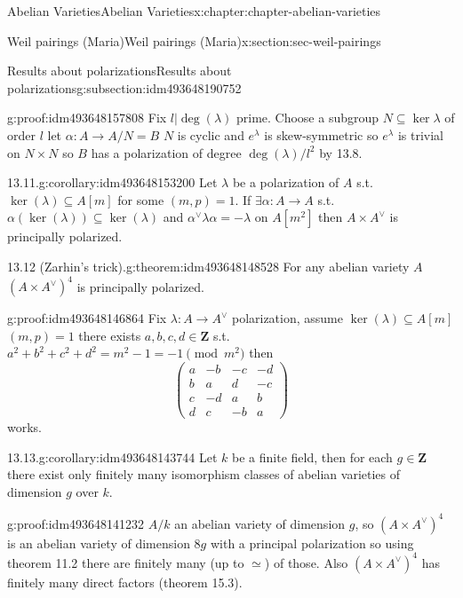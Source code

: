 \documentclass[oneside,10pt,]{book}
\numberwithin{equation}{section}
\newcommand{\lb}{[}
\newcommand{\rb}{]}
\newcommand{\ZZ}{\mathbf{Z}}
\newcommand{\amp}{&}
\begin{document}
\begin{chapterptx}{Abelian Varieties}{}{Abelian Varieties}{}{}{x:chapter:chapter-abelian-varieties}
\begin{sectionptx}{Weil pairings (Maria)}{}{Weil pairings (Maria)}{}{}{x:section:sec-weil-pairings}
\begin{subsectionptx}{Results about polarizations}{}{Results about polarizations}{}{}{g:subsection:idm493648190752}
\begin{proofptx}{}{g:proof:idm493648157808}
Fix \(l |\deg(\lambda)\) prime. Choose a subgroup \(N\subseteq \ker \lambda\) of order \(l\) let \(\alpha \colon A\to A/N = B\) \(N\) is cyclic and \(e^\lambda\) is skew-symmetric so \(e^{\lambda}\) is trivial on \(N\times N\) so \(B\) has a polarization of degree \(\deg(\lambda) / l^2\) by 13.8.%
\end{proofptx}
\begin{corollary}{13.11.}{}{g:corollary:idm493648153200}%
Let \(\lambda\) be a polarization of \(A\) s.t. \(\ker (\lambda) \subseteq A\lb m \rb\) for some \((m,p)=1\). If \(\exists \alpha \colon A \to A\) s.t. \(\alpha(\ker (\lambda)) \subseteq \ker(\lambda)\) and \(\alpha^\vee \lambda \alpha = - \lambda\) on \(A\lb m^2\rb\) then \(A\times A^\vee\) is principally polarized.%
\end{corollary}
\begin{theorem}{13.12 (Zarhin's trick).}{}{g:theorem:idm493648148528}%
For any abelian variety \(A\) \((A\times A^\vee)^4\) is principally polarized.%
\end{theorem}
\begin{proofptx}{}{g:proof:idm493648146864}
Fix \(\lambda \colon A\to A^\vee\) polarization, assume \(\ker (\lambda) \subseteq A\lb m \rb\) \((m, p) = 1\) there exists \(a,b,c,d \in \ZZ\) s.t. \(a^2 + b^2 + c^2 + d^2 = m^2  - 1 = -1 \pmod {m^2}\) then%
\begin{equation*}
\begin{pmatrix} a\amp -b \amp-c\amp -d \\ b\amp a \amp d \amp -c \\ c\amp -d \amp a \amp b \\ d \amp c \amp -b \amp a\end{pmatrix}
\end{equation*}
works.%
\end{proofptx}
\begin{corollary}{13.13.}{}{g:corollary:idm493648143744}%
Let \(k\) be a finite field, then for each \(g \in \ZZ\) there exist only finitely many isomorphism classes of abelian varieties of dimension \(g\) over \(k\).%
\end{corollary}
\begin{proofptx}{}{g:proof:idm493648141232}
\(A/k\) an abelian variety of dimension \(g\), so \((A\times A^\vee)^4\) is an abelian variety of dimension \(8g\) with a principal polarization so using theorem 11.2 there are finitely many (up to \(\simeq\)) of those. Also \((A\times A^\vee)^4\) has finitely many direct factors (theorem 15.3).%
\end{proofptx}

\end{subsectionptx}
\end{sectionptx}
\end{chapterptx}
\end{document}

